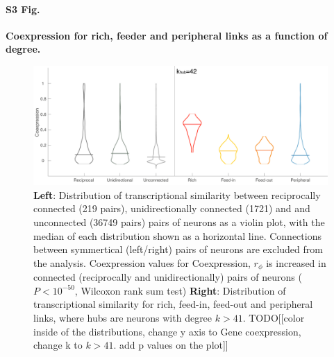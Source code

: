 \documentclass[10pt,letterpaper]{article}
\begin{document}
\paragraph*{S3 Fig.}
{\bf Coexpression for rich, feeder and peripheral links as a function of degree.}
\begin{figure}[!h]
\label{S3_Fig}
\centering
    \includegraphics[width=1\textwidth]{Distributions.pdf}
    \caption{\textbf{Left}: Distribution of transcriptional similarity between reciprocally connected (219 pairs), unidirectionally connected (1721) and  and unconnected (36749 pairs) pairs of neurons as a violin plot, with the median of each distribution shown as a horizontal line. Connections between symmertical (left/right) pairs of neurons are excluded from the analysis. Coexpression values for 
Coexpression, $r_\phi$ is increased in connected (reciprocally and unidirectionally) pairs of neurons ($P < 10^{-50}$, Wilcoxon rank sum test)
\textbf{Right}: Distribution of transcriptional similarity for rich, feed-in, feed-out and peripheral links, where hubs are neurons with degree $k>41$. TODO[[color inside of the distributions, change y axis to Gene coexpression, change k to $k>41$. add p values on the plot]]}
\end{figure}

\end{document}
